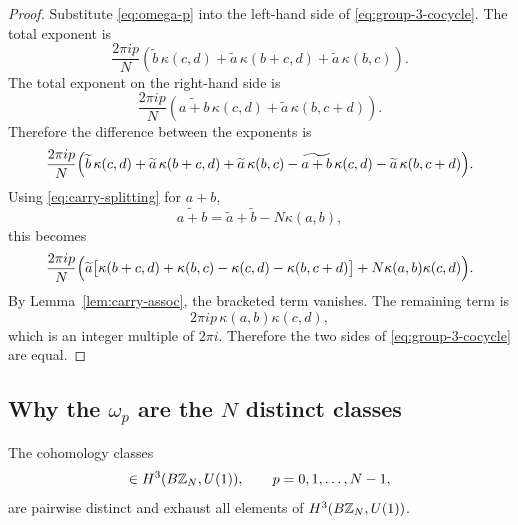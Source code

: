 \begin{proof}
Substitute \eqref{eq:omega-p} into the left-hand side of \eqref{eq:group-3-cocycle}. The total exponent is
\begin{equation*}
\frac{2\pi i p}{N}
\left(
\widetilde{b}\,\kappa(c,d)
+
\widetilde{a}\,\kappa(b+c,d)
+
\widetilde{a}\,\kappa(b,c)
\right).
\end{equation*}
The total exponent on the right-hand side is
\begin{equation*}
\frac{2\pi i p}{N}
\left(
\widetilde{a+b}\,\kappa(c,d)
+
\widetilde{a}\,\kappa(b,c+d)
\right).
\end{equation*}
Therefore the difference between the exponents is
\begin{align*}
\frac{2\pi i p}{N}
\Bigl(
\widetilde{b}\,\kappa(c,d)
+
\widetilde{a}\,\kappa(b+c,d)
+
\widetilde{a}\,\kappa(b,c)
-\widetilde{a+b}\,\kappa(c,d)
-\widetilde{a}\,\kappa(b,c+d)
\Bigr).
\end{align*}
Using \eqref{eq:carry-splitting} for $a+b$,
\begin{equation*}
\widetilde{a+b}=\widetilde{a}+\widetilde{b}-N\kappa(a,b),
\end{equation*}
this becomes
\begin{align*}
\frac{2\pi i p}{N}
\Bigl(
\widetilde{a}\bigl[\kappa(b+c,d)+\kappa(b,c)-\kappa(c,d)-\kappa(b,c+d)\bigr]
+
N\kappa(a,b)\kappa(c,d)
\Bigr).
\end{align*}
By Lemma~\ref{lem:carry-assoc}, the bracketed term vanishes. The remaining term is
\begin{equation*}
2\pi i p\,\kappa(a,b)\kappa(c,d),
\end{equation*}
which is an integer multiple of $2\pi i$. Therefore the two sides of \eqref{eq:group-3-cocycle} are equal.
\end{proof}

\subsection{Why the \texorpdfstring{$\omega_p$}{omega\_p} are the \texorpdfstring{$N$}{N} distinct classes}

\begin{proposition}\label{prop:omega-p-classification}
The cohomology classes
\begin{equation*}
[\omega_p]\in H^3(B\Z_N,U(1)),
\qquad
p=0,1,\dots,N-1,
\end{equation*}
are pairwise distinct and exhaust all elements of $H^3(B\mathbb{Z}_N,U(1))$.
\end{proposition}

